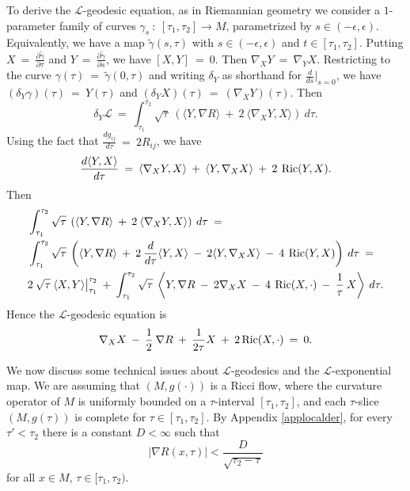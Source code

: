 To derive the ${\mathcal L}$-geodesic equation, as in Riemannian geometry
we consider a
$1$-parameter family of curves
$\gamma_s \: : \: [\tau_1, \tau_2] \rightarrow
M$, parametrized by $s \in (-\epsilon, \epsilon)$. Equivalently, we
have a map $\tilde\gamma(s, \tau)$ with $s \in (-\epsilon, \epsilon)$ and
$t \in [\tau_1, \tau_2]$. Putting $X \: = \:
\frac{\partial \tilde\gamma}{\partial \tau}$ and
$Y \: = \:
\frac{\partial \tilde\gamma}{\partial s}$, we have
$[X, Y] \: = \: 0$. Then $\nabla_X Y \: = \: \nabla_Y X$.
Restricting to the curve $\gamma(\tau) \: = \: \tilde\gamma(0, \tau)$ and
writing $\delta_Y$ as shorthand for $\frac{d}{ds} \big|_{s=0}$, we
have $(\delta_Y \gamma)(\tau) \:  =\: Y(\tau)$ and $(\delta_Y X)(\tau) \: = \:
(\nabla_X Y)(\tau)$.
Then
\begin{equation}
\delta_Y {\mathcal L} \: = \:
\int_{\tau_1}^{\tau_2} \sqrt{\tau} \: \left( \langle Y, \nabla R \rangle
\: + \: 2 \: \langle \nabla_X Y, X \rangle \right) \: d\tau.
\end{equation}
Using the fact that $\frac{dg_{ij}}{d\tau} \: = \: 2 R_{ij}$, we have
\begin{equation}
\frac{d\langle Y, X \rangle}{d\tau} \: = \:
\langle \nabla_X Y, X \rangle \: + \:
\langle Y, \nabla_X X \rangle \: + \:
2 \: \operatorname{Ric}(Y, X).
\end{equation}
Then
\begin{align}
\label{firstvariation}
& \int_{\tau_1}^{\tau_2} \sqrt{\tau} \: \left( \langle Y, \nabla R \rangle
\: + \: 2 \: \langle \nabla_X Y, X \rangle \right) \: d\tau \: = \\
& \int_{\tau_1}^{\tau_2} \sqrt{\tau} \: \left( \langle Y, \nabla R \rangle
\: + \: 2 \: \frac{d}{d\tau} \langle Y, X \rangle \: - \: 2
\langle Y, \nabla_X X \rangle \: - \: 4 \: \operatorname{Ric}(Y, X)
 \right) \: d\tau \: = \notag \\
& 2 \: \sqrt{{\tau}} \: \langle X, Y \rangle \big|_{\tau_1}^{\tau_2}
\: + \:
\int_{\tau_1}^{\tau_2} \sqrt{\tau} \: \left\langle Y, \nabla R
\: - \: 2 \nabla_X X  \: - \: 4 \: \operatorname{Ric}(X, \cdot) \: -\: \frac{1}{\tau}
\: X \right\rangle
 \: d\tau. \notag
\end{align}
Hence the ${\mathcal L}$-geodesic equation is
\begin{equation} \label{Lgeod}
\nabla_X X \: - \: \frac12 \: \nabla R \: + \: \frac{1}{2\tau} X \: + \:
2 \operatorname{Ric}(X, \cdot) \: = \: 0.
\end{equation}

We now discuss some technical issues about ${\mathcal L}$-geodesics and
the ${\mathcal L}$-exponential map.
We are assuming that $(M,g(\cdot))$ is a Ricci flow, where the curvature
operator
of $M$ is uniformly bounded on a $\tau$-interval $[\tau_1,\tau_2]$, and
each $\tau$-slice $(M,g(\tau))$ is complete for $\tau\in [\tau_1,\tau_2]$.
By Appendix \ref{applocalder},  for every $\tau'<\tau_2$ there
is a constant $D< \infty$ such that
\begin{equation}
\label{dr}
|\nabla R(x,\tau)|< \frac{D}{\sqrt{\tau_2 - \tau}}
\end{equation}
for all $x\in M$, $\tau \in [\tau_1, \tau_2)$.



